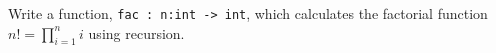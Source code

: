 Write a function, \lstinline{fac : n:int -> int}, which calculates the factorial function $n! = \prod_{i=1}^ni$ using recursion.
